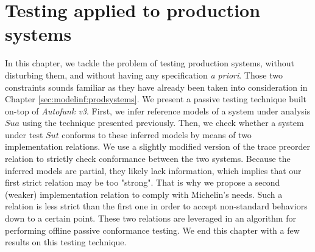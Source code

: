 %
\chapter{Testing applied to production systems}
\label{sec:testing}

In this chapter, we tackle the problem of testing production
systems, without disturbing them, and without having any
specification \emph{a priori}. Those two constraints sounds
familiar as they have already been taken into consideration in
Chapter \ref{sec:modelinf:prodsystems}. We present a passive
testing technique built on-top of \emph{Autofunk v3}. First, we
infer reference models of a system under analysis $\mathit{Sua}$
using the technique presented previously.  Then, we check whether
a system under test $\mathit{Sut}$ conforms to these inferred
models by means of two implementation relations. We use a
slightly modified version of the trace preorder relation to
strictly check conformance between the two systems. Because the
inferred models are partial, they likely lack information, which
implies that our first strict relation may be too "strong".  That
is why we propose a second (weaker) implementation relation to
comply with Michelin's needs.  Such a relation is less strict
than the first one in order to accept non-standard behaviors down
to a certain point. These two relations are leveraged in an
algorithm for performing offline passive conformance testing.  We
end this chapter with a few results on this testing technique.\\

\minitoc
\clearpage

\pagebreak






\cleardoublepage
